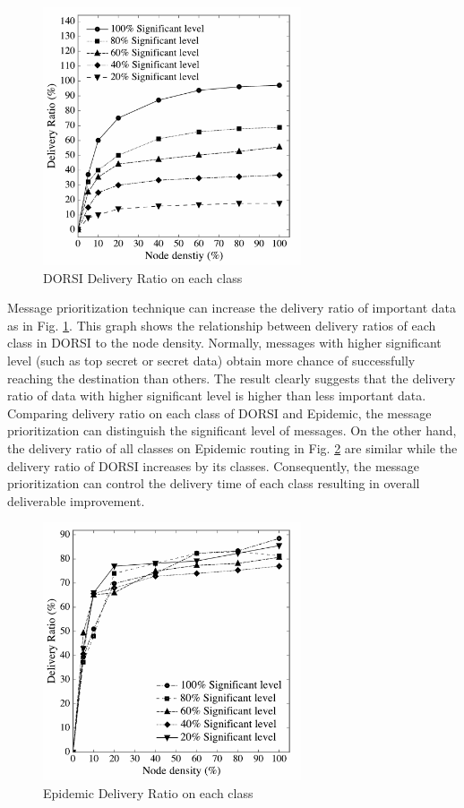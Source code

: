 \begin{figure}[!h]
\centering
\includegraphics[width=3in]{Graphs/DR_NodeDenstiy.pdf}
\caption{DORSI Delivery Ratio on each class}
\label{Fig:DORSI:DORSI Delivery Ratio on each class}
\end{figure}

Message prioritization technique can increase the delivery ratio of important data as in Fig. \ref{Fig:DORSI:DORSI Delivery Ratio on each class}. 
This graph shows the relationship between delivery ratios of each class in DORSI to the node density. 
Normally, messages with higher significant level (such as top secret or secret data) obtain more chance of successfully reaching the destination than others. The result clearly suggests that the delivery ratio of data with higher significant level is higher than less important data. 
Comparing delivery ratio on each class of DORSI and Epidemic, the message prioritization can distinguish the significant level of messages. 
On the other hand, the delivery ratio of all classes on Epidemic routing in Fig. \ref{Fig:DORSI:Epidemic Delivery Ratio on each class} are similar while the delivery ratio of DORSI increases by its classes. 
Consequently, the message prioritization can control the delivery time of each class resulting in overall deliverable improvement.

\begin{figure}[!h]
\centering
\includegraphics[width=3in]{Graphs/EpidemicDeliveryRatiooneachclass.pdf}
\caption{Epidemic Delivery Ratio on each class}
\label{Fig:DORSI:Epidemic Delivery Ratio on each class}
\end{figure}

